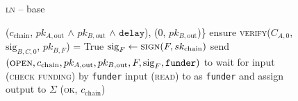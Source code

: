 \begin{figure}[H]
\begin{processbox}{\textsc{ln} -- base}
\begin{algorithmic}[1]
{          ($c_{\mathrm{chain}}$, $pk_{A, \mathrm{out}}$ $\wedge$ $pk_{B,
          \mathrm{out}}$ $\wedge$ $\texttt{delay}$), ($0$, $pk_{B,
          \mathrm{out}}$)\}}
          \State {}
          \State {}
          \State ensure \textsc{verify}($C_{A, 0}$, $\mathrm{sig}_{B, C, 0}$,
          $pk_{B, F}$) = True
        \EndIf
        \State $\mathrm{sig}_F \gets \textsc{sign}(F, sk_{\mathrm{chain}})$
        \State send $(\textsc{open}, c_{\mathrm{chain}}, pk_{A, \mathrm{out}},
        pk_{B, \mathrm{out}}, F, \mathrm{sig}_F, \texttt{funder})$ to \adversary
          \State wait for input (\textsc{check funding}) by \texttt{funder}
          \State input (\textsc{read}) to \ledger as \texttt{funder} and assign
          output to $\Sigma$
        \EndWhile
        \State \Return (\textsc{ok}, $c_{\mathrm{chain}}$)
      \EndIndent
    \end{algorithmic}
  \end{processbox}
  \caption{}
  \label{code:ln:base}
\end{figure}

